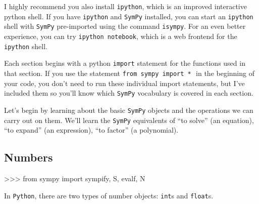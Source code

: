 I highly recommend you also install \texttt{ipython}, 
which is an improved interactive python shell.
If you have \texttt{ipython} and \texttt{SymPy} installed, 
you can start an \texttt{ipython} shell with \texttt{SymPy} pre-imported using the command \texttt{isympy}.
For an even better experience, 
you can try \texttt{ipython notebook}, which is a web frontend for the \texttt{ipython} shell.

Each section  begins with a python \texttt{import} statement
for the functions used in that section.
If you use the statement \texttt{from sympy import *}\,\, in the beginning of your code,
you don't need to run these individual import statements,
but I've included them so you'll know which 
\texttt{SymPy} vocabulary is covered in each section.





%

\label{sec:sympytut_fundamentals_of_mathematics}

Let's begin by learning about the basic \texttt{SymPy} objects and the operations we can carry out on them. 
We'll learn the \texttt{SymPy} equivalents of 
``to solve'' (an equation),  
``to expand'' (an expression), 
``to factor'' (a polynomial). 

\subsection{Numbers}
\label{basics:numbers}

\small
\begin{verbatimtab}
>>> from sympy import  sympify, S,  evalf, N
\end{verbatimtab}
\normalsize

\noindent
In \texttt{Python}, there are two types of number objects: \texttt{int}s and \texttt{float}s.%

